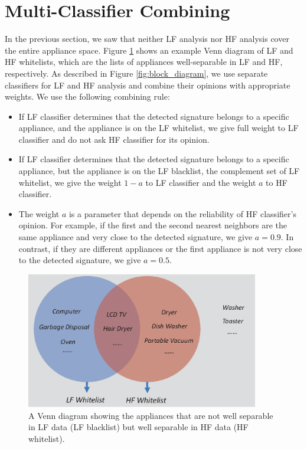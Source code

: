 \documentclass[11pt, letterpaper]{article}
\begin{document}
\section{Multi-Classifier Combining}\label{combined}
In the previous section, we saw that neither LF analysis nor HF analysis cover the entire appliance space. Figure \ref{fig:Venn_diagram} shows an example Venn diagram of LF and HF whitelists, which are the lists of appliances well-separable in LF and HF, respectively. As described in Figure \ref{fig:block_diagram}, we use separate classifiers for LF and HF analysis and combine their opinions with appropriate weights. We use the following combining rule:
\begin{itemize}
\item If LF classifier determines that the detected signature belongs to a specific appliance, and the appliance is on the LF whitelist, we give full weight to LF classifier and do not ask HF classifier for its opinion.
\item If LF classifier determines that the detected signature belongs to a specific appliance, but the appliance is on the LF blacklist, the complement set of LF whitelist, we give the weight $1-a$ to LF classifier and the weight $a$ to HF classifier.
\item The weight $a$ is a parameter that depends on the reliability of HF classifier's opinion. For example, if the first and the second nearest neighbors are the same appliance and very close to the detected signature, we give $a=0.9$. In contrast, if they are different appliances or the first appliance is not very close to the detected signature, we give $a=0.5$.
\end{itemize}



\begin{figure}[H]
\begin{center}
\includegraphics[width=4.0in]{Venn_diagram.eps}
  \caption{A Venn diagram showing the appliances that are not well separable in LF data (LF blacklist) but well separable in HF data (HF whitelist).}
  \label{fig:Venn_diagram}
\end{center}
\end{figure}
\end{document}
